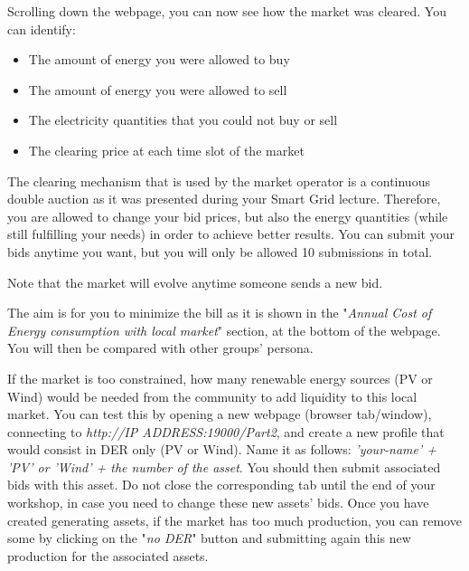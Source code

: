 \documentclass[a4paper, chapterprefix=true, openany]{scrbook}
\begin{document}
Scrolling down the webpage, you can now see how the market was cleared. You can identify:
\begin{itemize}
	\item The amount of energy you were allowed to buy
	\item The amount of energy you were allowed to sell
	\item The electricity quantities that you could not buy or sell
	\item The clearing price at each time slot of the market
\end{itemize}

The clearing mechanism that is used by the market operator is a continuous double auction as it was presented during your Smart Grid lecture.  
Therefore, you are allowed to change your bid prices, but also the energy quantities (while still fulfilling your needs) in order to achieve better results. You can submit your bids anytime you want, but you will only be allowed 10 submissions in total. 

Note that the market will evolve anytime someone sends a new bid.

The aim is for you to minimize the bill as it is shown in the "\textit{Annual Cost of Energy consumption with local market}" section, at the bottom of the webpage. You will then be compared with other groups' persona. 

If the market is too constrained, how many renewable energy sources (PV or Wind) would be needed from the community to add liquidity to this local market. You can test this by opening a new webpage (browser tab/window), connecting to \textit{http://IP ADDRESS:19000/Part2}, and create a new profile that would consist in DER only (PV or Wind). Name it as follows: \textit{'your-name' + 'PV' or 'Wind' + the number of the asset}. You should then submit associated bids with this asset. Do not close the corresponding tab until the end of your workshop, in case you need to change these new assets' bids. 
Once you have created generating assets, if the market has too much production, you can remove some by clicking on the "\textit{no DER}" button and submitting again this new production for the associated assets.
\end{document}
